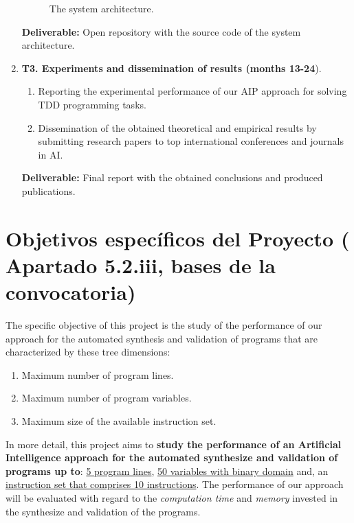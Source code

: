 \documentclass[10pt,a4paper]{paper}
\begin{document}
\begin{enumerate}
\begin{figure}[hbt!]
\begin{center}
\end{center}  
\caption{\small The system architecture.}
\label{fig:architecture}
\end{figure}

{\small {\bf Deliverable:} Open repository with the source code of the system architecture.}
    
\item {\bf T3. Experiments and dissemination of results (months 13-24}).
   \begin{small}
      \begin{enumerate}
      \item Reporting the experimental performance of our AIP approach for solving TDD programming tasks.
      \item Dissemination of the obtained theoretical and empirical results by submitting research papers to top international conferences and journals in AI.        
      \end{enumerate}
\end{small}        
{\small {\bf Deliverable:} Final report with the obtained conclusions and produced publications.}
\end{enumerate}


\section{Objetivos específicos del Proyecto ( Apartado 5.2.iii, bases de la convocatoria)}
\label{subsec:objectivos}

The specific objective of this project is the study of the performance of our approach for the automated synthesis and validation of programs that are characterized by these tree dimensions:
\begin{enumerate}
\item Maximum number of program lines.
\item Maximum number of program variables. 
\item Maximum size of the available instruction set.  
\end{enumerate}

In more detail, this project aims to {\bf study the performance of an Artificial Intelligence approach for the automated synthesize and validation of programs up to}: \underline{5 program lines}, \underline{50 variables with binary domain} and, an \\\underline{instruction set that comprises 10 instructions}. The performance of our approach will be evaluated with regard to the {\em computation time} and {\em memory} invested in the synthesize and validation of the programs.
\end{document}
